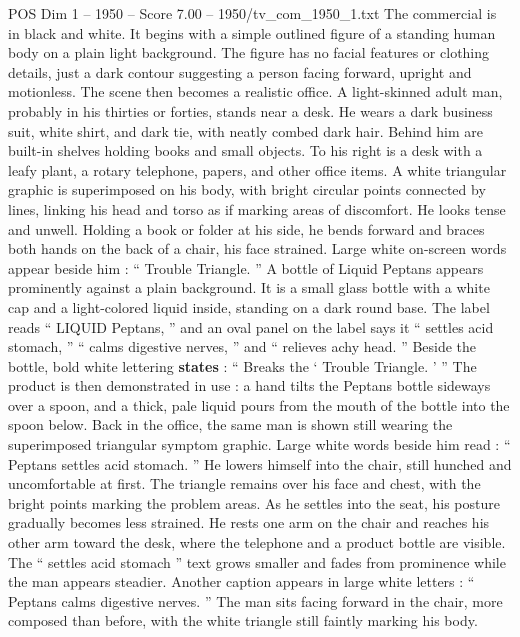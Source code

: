 \begin{textsample}{POS Dim 1 – 1950 – Score 7.00 – 1950/tv\_com\_1950\_1.txt}  \label{ex:f1_pos_082}
The commercial is in black and white.
It begins with a simple outlined figure of a standing human body on a plain light background.
The figure has no facial features or clothing details, just a dark contour suggesting a person facing forward, upright and motionless.
The scene then becomes a realistic office.
A light-skinned adult man, probably in his thirties or forties, stands near a desk.
He wears a dark business suit, white shirt, and dark tie, with neatly combed dark hair.
Behind him are built-in shelves holding books and small objects.
To his right is a desk with a leafy plant, a rotary telephone, papers, and other office items.
A white triangular graphic is superimposed on his body, with bright circular points connected by lines, linking his head and torso as if marking areas of discomfort.
He looks tense and unwell.
Holding a book or folder at his side, he bends forward and braces both hands on the back of a chair, his face strained.
Large white on-screen words appear beside him : “ Trouble Triangle. ” A bottle of Liquid Peptans appears prominently against a plain background.
It is a small glass bottle with a white cap and a light-colored liquid inside, standing on a dark round base.
The label reads “ LIQUID Peptans, ” and an oval panel on the label says it “ settles acid stomach, ” “ calms digestive nerves, ” and “ relieves achy head. ” Beside the bottle, bold white lettering \textbf{states} : “ Breaks the ‘ Trouble Triangle. ’ ” The product is then demonstrated in use : a hand tilts the Peptans bottle sideways over a spoon, and a thick, pale liquid pours from the mouth of the bottle into the spoon below.
Back in the office, the same man is shown still wearing the superimposed triangular symptom graphic.
Large white words beside him read : “ Peptans settles acid stomach. ” He lowers himself into the chair, still hunched and uncomfortable at first.
The triangle remains over his face and chest, with the bright points marking the problem areas.
As he settles into the seat, his posture gradually becomes less strained.
He rests one arm on the chair and reaches his other arm toward the desk, where the telephone and a product bottle are visible.
The “ settles acid stomach ” text grows smaller and fades from prominence while the man appears steadier.
Another caption appears in large white letters : “ Peptans calms digestive nerves. ” The man sits facing forward in the chair, more composed than before, with the white triangle still faintly marking his body.

\end{textsample}
